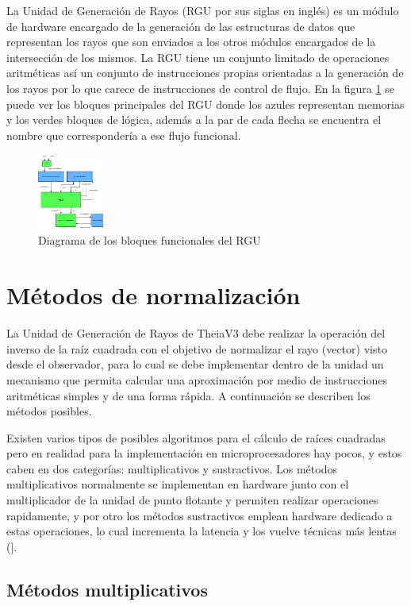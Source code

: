 La Unidad de Generación de Rayos (RGU por sus siglas en inglés) es un módulo de hardware encargado de la generación de las estructuras de datos que representan los rayos que son enviados a los otros módulos encargados de la intersección de los mismos. La RGU tiene un conjunto limitado de operaciones aritméticas así un conjunto de instrucciones propias orientadas a la generación de los rayos por lo que carece de instrucciones de control de flujo. En la figura \ref{fig:rgu} se puede ver los bloques principales del RGU donde los azules representan memorias y los verdes bloques de lógica, además a la par de cada flecha se encuentra el nombre que correspondería a ese flujo funcional.

\begin{figure}
	\includegraphics[width=1\linewidth, height=2.5cm]{images/rgu}
	\caption{Diagrama de los bloques funcionales del RGU} \label{fig:rgu}
\end{figure}

\section{Métodos de normalización}

La Unidad de Generación de Rayos de TheiaV3 debe realizar la operación del inverso de la raíz cuadrada con el objetivo de normalizar el rayo (vector) visto desde el observador, para lo cual se debe implementar dentro de
la unidad un mecanismo que permita calcular una aproximación por medio de instrucciones aritméticas simples y de una forma rápida.  A continuación se describen los métodos posibles. 

Existen varios tipos de posibles algoritmos para el cálculo de raíces cuadradas pero en realidad para la implementación en microprocesadores hay pocos, y estos caben en dos categorías: multiplicativos y sustractivos. Los métodos multiplicativos normalmente se implementan en hardware junto con el multiplicador de la unidad de punto flotante y permiten realizar operaciones rapidamente, y por otro los métodos sustractivos emplean hardware dedicado a estas operaciones, lo cual incrementa la latencia y los vuelve técnicas más lentas (\cite{Soderquist1997}].   

\subsection{Métodos multiplicativos}

